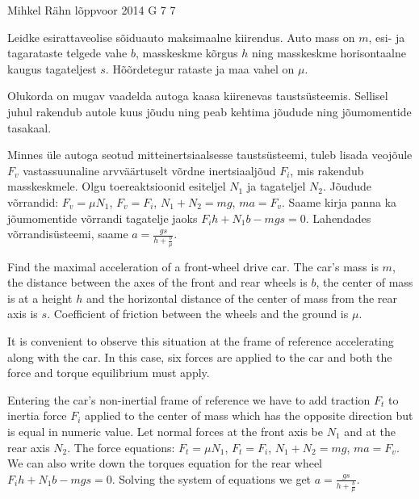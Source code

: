 {Mihkel Rähn} %
{lõppvoor} %
{2014} %
{G 7} %
{7} %
{
\ifStatement
Leidke esirattaveolise sõiduauto maksimaalne kiirendus. Auto mass on $m$, esi- ja tagarataste telgede vahe $b$, masskeskme kõrgus $h$ ning masskeskme horisontaalne kaugus tagateljest $s$. Hõõrdetegur rataste ja maa vahel on $\mu$.
\fi


\ifHint
Olukorda on mugav vaadelda autoga kaasa kiirenevas taustsüsteemis. Sellisel juhul rakendub autole kuus jõudu ning peab kehtima jõudude ning jõumomentide tasakaal.
\fi


\ifSolution
Minnes üle autoga seotud mitteinertsiaalsesse taustsüsteemi, tuleb lisada veojõule $F_v$ vastassuunaline arvväärtuselt võrdne inertsiaaljõud $F_i$, mis rakendub masskeskmele. Olgu toereaktsioonid esiteljel $N_1$ ja tagateljel $N_2$. Jõudude võrrandid: $F_v=\mu N_1$, $F_v=F_i$, $N_1+N_2=mg$, $ma=F_v$. Saame kirja panna ka jõumomentide võrrandi tagatelje jaoks $F_ih+N_1b-mgs=0$.
Lahendades võrrandisüsteemi, saame $a=\frac{gs}{h+\frac{b}{\mu}}$.
\fi


\ifEngStatement
Find the maximal acceleration of a front-wheel drive car. The car’s mass is $m$, the distance between the axes of the front and rear wheels is $b$, the center of mass is at a height $h$ and the horizontal distance of the center of mass from the rear axis is $s$. Coefficient of friction between the wheels and the ground is $\mu$.
\fi


\ifEngHint
It is convenient to observe this situation at the frame of reference accelerating along with the car. In this case, six forces are applied to the car and both the force and torque equilibrium must apply.
\fi


\ifEngSolution
Entering the car’s non-inertial frame of reference we have to add traction $F_t$ to inertia force $F_i$ applied to the center of mass which has the opposite direction but is equal in numeric value. Let normal forces at the front axis be $N_1$ and at the rear axis $N_2$. The force equations: $F_t=\mu N_1$, $F_t=F_i$, $N_1+N_2=mg$, $ma=F_v$. We can also write down the torques equation for the rear wheel $F_ih+N_1b-mgs=0$. Solving the system of equations we get $a=\frac{gs}{h+\frac{b}{\mu}}$.
\fi
}